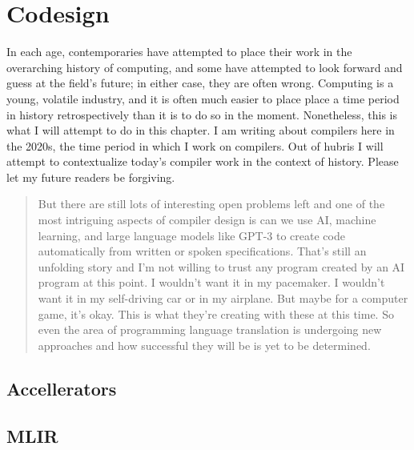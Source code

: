 \chapter{Codesign}

In each age, contemporaries have attempted to place their work in the overarching history of computing,
and some have attempted to look forward and guess at the field's future;
in either case, they are often wrong.
Computing is a young, volatile industry, and it is often much easier to place
place a time period in history retrospectively than it is to do so in the moment.
Nonetheless, this is what I will attempt to do in this chapter.
I am writing about compilers here in the 2020s, the time period in which I work on compilers.
Out of hubris I will attempt to contextualize today's compiler work in the context of history.
Please let my future readers be forgiving.

\begin{quotation}
But there are still lots of interesting open problems left and one of the most intriguing aspects of
compiler design is can we use AI, machine learning, and large language models like GPT-3 to create
code automatically from written or spoken specifications. That's still an unfolding story and I'm not willing
to trust any program created by an AI program at this point. I wouldn't want it in my pacemaker. I wouldn't
want it in my self-driving car or in my airplane. But maybe for a computer game, it's okay. This is what
they're creating with these at this time. So even the area of programming language translation is
undergoing new approaches and how successful they will be is yet to be determined.
\cite{aho_oral_history_2022}
\end{quotation}

\section{Accellerators}
\section{MLIR}
